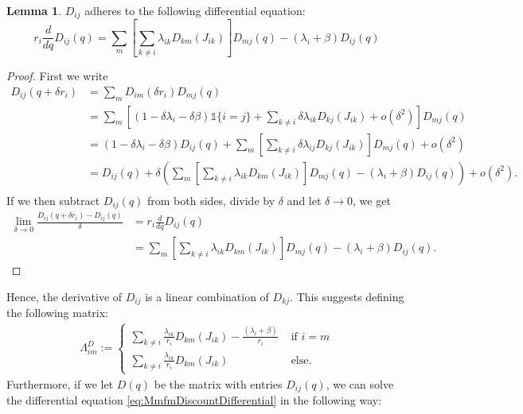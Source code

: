 \documentclass[a4paper]{thesis}
\theoremstyle{definition}
\newtheorem{lemma}{Lemma}[chapter]
\begin{document}
\begin{lemma}
	$D_{ij}$ adheres to the following differential equation:
	\begin{equation}\label{eq:MmfmDiscountDifferential}
	r_i\frac{d}{dq}D_{ij}(q)=\sum\limits_m\left[\sum\limits_{k\neq i}\lambda_{ik}D_{km}(J_{ik})\right] D_{mj}(q)-(\lambda_i+\beta)D_{ij}(q)
	\end{equation}
	\begin{proof}
		First we write
		\[
		\begin{split}
		D_{ij}(q+\delta r_i)&=\sum_mD_{im}(\delta r_i)D_{mj}(q)\\
		&=\sum\limits_m\left[(1-\delta\lambda_i-\delta\beta)\mathds{1}\{i=j\}+\sum\limits_{k\neq i}\delta\lambda_{ik}D_{kj}(J_{ik})+o(\delta^2)\right]D_{mj}(q)\\
		&=(1-\delta\lambda_i-\delta\beta)D_{ij}(q)+\sum\limits_m\left[\sum\limits_{k\neq i}\delta\lambda_{ij}D_{kj}(J_{ik})\right]D_{mj}(q)+o(\delta^2)\\
		&=D_{ij}(q)+\delta\left( \sum\limits_m\left[\sum\limits_{k\neq i}\lambda_{ik}D_{km}(J_{ik})\right] D_{mj}(q)-(\lambda_i+\beta)D_{ij}(q) \right)+o(\delta^2).\\
		\end{split}
		\]
		If we then subtract $D_{ij}(q)$ from both sides, divide by $\delta$ and let $\delta\rightarrow 0$, we get
		\[
		\begin{split}
		\lim\limits_{\delta\rightarrow 0}\frac{D_{ij}(q+\delta r_i)-D_{ij}(q)}{\delta}&=r_i\frac{d}{dq}D_{ij}(q)\\
		&=\sum\limits_m\left[\sum\limits_{k\neq i}\lambda_{ik}D_{km}(J_{ik})\right] D_{mj}(q)-(\lambda_i+\beta)D_{ij}(q).
		\end{split}
		\]
	\end{proof}
\end{lemma}
Hence, the derivative of $D_{ij}$ is a linear combination of $D_{kj}$.
This suggests defining the following matrix:
\begin{equation}\label{eq:MmfmDiscountGenerator}
\begin{split}
\Lambda^D_{im}:=\begin{cases}
\sum\limits_{k\neq i}\frac{\lambda_{ik}}{r_i}D_{km}(J_{ik})-\frac{(\lambda_i+\beta)}{r_i}&\text{ if }i=m\\
\sum\limits_{k\neq i}\frac{\lambda_{ik}}{r_i}D_{km}(J_{ik})&\text{ else.}
\end{cases}
\end{split}
\end{equation}
Furthermore, if we let $D(q)$ be the matrix with entries $D_{ij}(q)$, we can solve the differential equation \eqref{eq:MmfmDiscountDifferential} in the following way:
\end{document}
